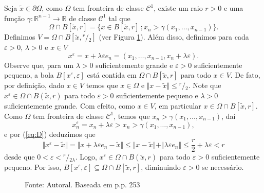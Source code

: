 \documentclass[a4paper, 11pt]{book}
\theoremstyle{definition}
\newcommand{\bR}{\mathbb{R}}
\newcommand{\cC}{\mathcal{C}}
\newcommand{\sfrac}[2]{{}^{#1}\!\!/\!_{#2}}
\begin{document}
\begin{prf}
    Seja $\tilde x \in \partial \Omega$, como $\Omega$ tem fronteira de classe $\cC^1$, existe um raio $r > 0$ e uma função $\gamma : \bR^{n-1} \to \bR$ de classe $\cC^1$ tal que
    \begin{equation} \label{eq:E}
        \Omega \cap B[\tilde x, r] = \{x \in B[\tilde x, r] \,; x_n > \gamma(x_1,\dots,x_{n-1})\}.
    \end{equation}
    Definimos $V = \Omega \cap B[\tilde x, \sfrac{r}{2}]$ (ver Figura \ref{fig:conjunto-demonstracao-aprox-3}).
    Além disso, definimos para cada $\varepsilon > 0$, $\lambda > 0$ e $x \in V$
    \begin{equation} \label{eq:D}
        x^\varepsilon = x + \lambda \varepsilon e_n = (x_1,\dots,x_{n-1}, x_n + \lambda\varepsilon).
    \end{equation}
    Observe que, para um $\lambda > 0$ suficientemente grande e $\varepsilon > 0$ suficientemente pequeno, a bola $B[x^\varepsilon\!,\varepsilon]$ está contída em $\Omega \cap B[\tilde x,r]$ para todo $x \in V$.
    De fato, por definição, dado $x \in V$ temos que $x \in \Omega$ e $\Vert x - \tilde x \Vert \leqslant \sfrac{r}{2}$.
    Note que $x^\varepsilon \in \Omega \cap B(\tilde x, r)$ para todo $\varepsilon > 0$ suficientemente pequeno e $\lambda > 0$ suficientemente grande.
    Com efeito, como $x \in V$, em particular $x \in \Omega \cap B[\tilde x, r]$.
    Como $\Omega$ tem fronteira de classe $\cC^1$, temos que $x_n > \gamma(x_1,\dots,x_{n-1})$, daí
    \[
        x^\varepsilon_n = x_n + \lambda \varepsilon > x_n >  \gamma(x_{1},\dots,x_{n-1}),
    \]
    e por (\ref{eq:D}) deduzimos que
    \[
        \Vert x^\varepsilon - \tilde x \Vert = \Vert x + \lambda \varepsilon e_n - \tilde x \Vert \leqslant \Vert x - \tilde x \Vert + \Vert \lambda \varepsilon e_n  \Vert \leqslant \frac{r}{2} + \lambda\varepsilon < r
    \]
    desde que $0 <\varepsilon < \sfrac{r}{2\lambda}$.
    Logo, $x^\varepsilon \in \Omega \cap B(\tilde x, r)$ para todo $\varepsilon > 0$ suficientemente pequeno.
    Por isso,
    $B[x^\varepsilon\!, \varepsilon] \subseteq \Omega \cap B[\tilde x,r]$, diminuindo $\varepsilon > 0$ se necessário.
    \begin{figure} \label{fig:conjunto-demonstracao-aprox-3}
        \centering
        
        \caption{Fonte: Autoral. Baseada em \cite{evans-pde} p.p. 253}
    \end{figure}


\end{prf}
\end{document}
